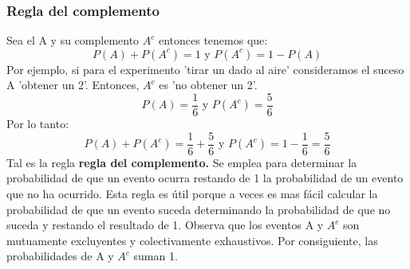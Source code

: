 \documentclass[]{article}
\begin{document}
\subsubsection*{Regla del complemento}
Sea el A y su complemento $A^{c}$ entonces tenemos que:
\[ P(A) + P(A^{c}) = 1 \text{ y } P(A^{c}) = 1 - P(A) \]
Por ejemplo, si para el experimento 'tirar un dado al aire'  consideramos el suceso A 'obtener un 2'. Entonces, $A^{c}$ es 'no obtener un 2'.
\[ P(A) = \frac{1}{6} \text{ y } P(A^{c}) = \frac{5}{6}\]
Por lo tanto:
\[ P(A) + P(A^{c}) = \frac{1}{6}  + \frac{5}{6} \text{ y } P(A^{c}) = 1 - \frac{1}{6} = \frac{5}{6} \]
Tal es la regla \textbf{regla del complemento.} Se emplea para determinar la probabilidad de que un evento ocurra restando de 1 la probabilidad de un evento que no ha ocurrido. Esta regla es útil porque a veces es mas fácil calcular la probabilidad de que un evento suceda determinando la probabilidad de que no suceda y restando el resultado de 1. Observa que los eventos A y $A^{c}$ son mutuamente excluyentes y colectivamente exhaustivos. Por consiguiente, las probabilidades de A y $A^{c}$ suman 1.
\end{document}
